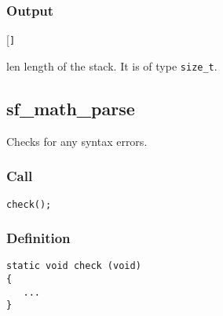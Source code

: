 \subsubsection*{Output}
\begin{desclist}{\tt }{\quad}[\tt ]
   \setlength\itemsep{0pt}
   \item[len] length of the stack. It is of type \texttt{size\_t}.
\end{desclist}




\subsection{{sf\_math\_parse}}
Checks for any syntax errors.

\subsubsection*{Call}
\begin{verbatim}check();\end{verbatim}

\subsubsection*{Definition}
\begin{verbatim}
static void check (void)
{
   ...   
}
\end{verbatim}



